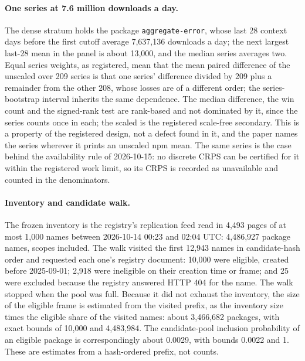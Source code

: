 \paragraph{One series at 7.6 million downloads a day.} The dense stratum holds the package
\texttt{aggregate-error}, whose last 28 context days before the first cutoff average 7,637,136 downloads a
day; the next largest last-28 mean in the panel is about 13,000, and the median series averages two.
Equal series weights, as registered, mean that the mean paired difference of the unscaled \qs{} over 209
series is that one series' difference divided by 209 plus a remainder from the other 208, whose losses are
of a different order; the series-bootstrap interval inherits the same dependence. The median difference,
the win count and the signed-rank test are rank-based and not dominated by it, since the series counts once
in each; the scaled \qs{} is the registered scale-free secondary. This is a property of the registered
design, not a defect found in it, and the paper names the series wherever it prints an unscaled npm mean.
The same series is the case behind the availability rule of 2026-10-15: no discrete CRPS can be certified
for it within the registered work limit, so its CRPS is recorded as unavailable and counted in the
denominators.

\paragraph{Inventory and candidate walk.} The frozen inventory is the registry's replication feed read in
4,493 pages of at most 1,000 names between 2026-10-14 00:23 and 02:04 UTC: 4,486,927 package names, scopes
included. The walk visited the first 12,943 names in candidate-hash order and requested each one's registry
document: 10,000 were eligible, created before 2025-09-01; 2,918 were ineligible on their creation time or
frame; and 25 were excluded because the registry answered HTTP 404 for the name. The walk stopped when the
pool was full. Because it did not exhaust the inventory, the size of the eligible frame is estimated from
the visited prefix, as the inventory size times the eligible share of the visited names: about 3,466,682
packages, with exact bounds of 10,000 and 4,483,984. The candidate-pool inclusion probability of an eligible
package is correspondingly about 0.0029, with bounds 0.0022 and 1. These are estimates from a hash-ordered
prefix, not counts.

